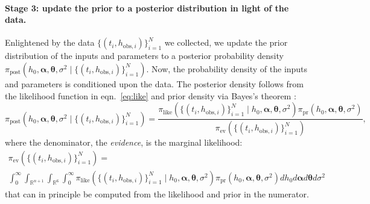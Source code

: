 \documentclass[openacc]{rsproca_new}%
\newcommand\thedata {$\{(t_i,h_{\text{obs}, i})\}_{i=1}^{N}$\xspace}
\newcommand\thedatanomath {\{(t_i,h_{\text{obs}, i})\}_{i=1}^{N}}
\begin{document}
\paragraph{Stage 3: update the prior to a posterior distribution in light of the data.}
Enlightened by the data \thedata we collected, we update the prior distribution of the inputs and parameters to a posterior probability density $\pi_{\text{post}}(h_0, \boldsymbol \alpha, \boldsymbol \theta, \sigma^2 \mid \thedatanomath)$. Now, the probability density of the inputs and parameters is conditioned upon the data.
The posterior density follows from the likelihood function in eqn.~\ref{eq:like} and prior density via Bayes's theorem \cite{van2021bayesian,calvetti2018inverse}:
\begin{equation}
	\pi_{\text{post}}(h_0, \boldsymbol \alpha, \boldsymbol \theta, \sigma^2 \mid \thedatanomath) = \frac{
	\pi_{\text{like}}(\thedatanomath \mid h_0,  \boldsymbol \alpha, \boldsymbol \theta, \sigma^2 ) 
	\pi_{\text{pr}}(h_0, \boldsymbol\alpha, \boldsymbol \theta, \sigma^2)
	}{
	\pi_{\text{ev}}(\thedatanomath) 
	}, \label{eq:post}
\end{equation} where the denominator, the \emph{evidence}, is the marginal likelihood:
\begin{multline}
    \pi_{\text{ev}}(\thedatanomath) = \\ 
    \int_0^\infty\int_{\mathbb{R}^{n+1}}  \int_{\mathbb{R}^6}  \int_0^\infty 
    \pi_{\text{like}}(\thedatanomath \mid h_0,  \boldsymbol \alpha, \boldsymbol \theta, \sigma^2 ) 
	\pi_{\text{pr}}(h_0, \boldsymbol\alpha, \boldsymbol \theta, \sigma^2)
	dh_0 d \boldsymbol\alpha d \boldsymbol\theta d\sigma^2 \label{eq:ev}
\end{multline}
that can in principle be computed from the likelihood and prior in the numerator. 
\end{document}
